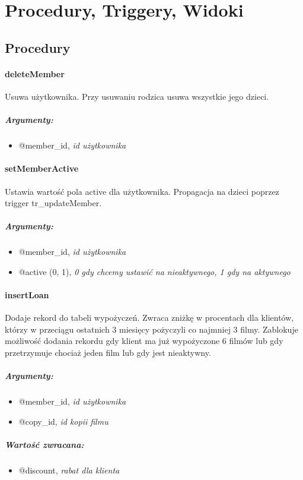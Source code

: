 \documentclass[12pt,a4paper,titlepage]{article}
\begin{document}

\newpage
\section{Procedury, Triggery, Widoki}


\subsection{Procedury}
\paragraph{deleteMember}
Usuwa użytkownika. Przy usuwaniu rodzica usuwa wszystkie jego dzieci.
\subparagraph{Argumenty:}
\begin{itemize}
	\item @member\_id, \textit{id użytkownika}
\end{itemize}

\paragraph{setMemberActive}
Ustawia wartość pola active dla użytkownika. Propagacja na dzieci poprzez trigger tr\_updateMember.
\subparagraph{Argumenty:}
\begin{itemize}
	\item @member\_id, \textit{id użytkownika}
	\item @active (0, 1), \textit{0 gdy chcemy ustawić na nieaktywnego, 1 gdy na aktywnego}
\end{itemize}

\paragraph{insertLoan}
Dodaje rekord do tabeli wypożyczeń. Zwraca zniżkę w procentach dla klientów, którzy w przeciągu ostatnich 3 miesięcy pożyczyli co najmniej 3 filmy.
Zablokuje możliwość dodania rekordu gdy klient ma już wypożyczone 6 filmów lub gdy przetrzymuje chociaż jeden film lub gdy jest nieaktywny.
\subparagraph{Argumenty:}
\begin{itemize}
	\item @member\_id, \textit{id użytkownika}
	\item @copy\_id, \textit{id kopii filmu}
\end{itemize}
\subparagraph{Wartość zwracana:}
\begin{itemize}
	\item @discount, \textit{rabat dla klienta}
\end{itemize}
\end{document}
